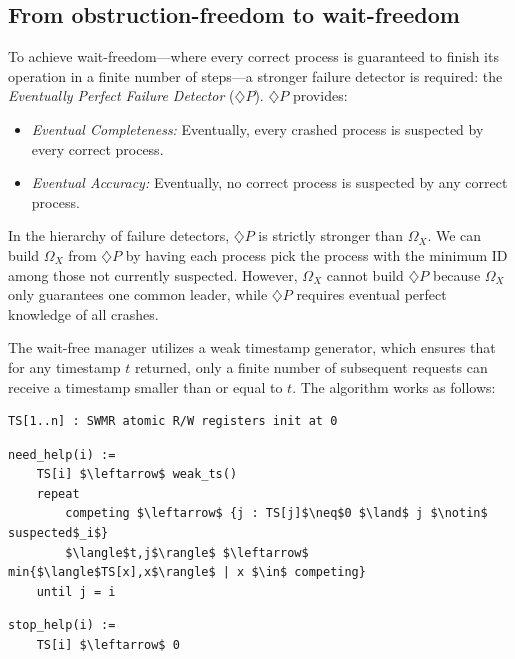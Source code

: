 \subsection{From obstruction-freedom to wait-freedom}
To achieve wait-freedom—where every correct process is guaranteed to finish its operation in a finite number of steps—a stronger failure detector is required: the \textit{Eventually Perfect Failure Detector} ($\diamondsuit P$). $\diamondsuit P$ provides:
\begin{itemize}
    \item \textit{Eventual Completeness:} Eventually, every crashed process is suspected by every correct process.
    \item \textit{Eventual Accuracy:} Eventually, no correct process is suspected by any correct process.

\end{itemize}

In the hierarchy of failure detectors, $\diamondsuit P$ is strictly stronger than $\Omega_X$. We can build $\Omega_X$ from $\diamondsuit P$ by having each process pick the process with the minimum ID among those not currently suspected. However, $\Omega_X$ cannot build $\diamondsuit P$ because $\Omega_X$ only guarantees one common leader, while $\diamondsuit P$ requires eventual perfect knowledge of all crashes.

The wait-free manager utilizes a weak timestamp generator, which ensures that for any timestamp $t$ returned, only a finite number of subsequent requests can receive a timestamp smaller than or equal to $t$. The algorithm works as follows:

\begin{minipage}{\textwidth}
\begin{lstlisting}[mathescape]
TS[1..n] : SWMR atomic R/W registers init at 0
\end{lstlisting}
\begin{lstlisting}[mathescape]
need_help(i) :=
    TS[i] $\leftarrow$ weak_ts()
    repeat
        competing $\leftarrow$ {j : TS[j]$\neq$0 $\land$ j $\notin$ suspected$_i$}
        $\langle$t,j$\rangle$ $\leftarrow$ min{$\langle$TS[x],x$\rangle$ | x $\in$ competing}
    until j = i
\end{lstlisting}
\begin{lstlisting}[mathescape]
stop_help(i) :=
    TS[i] $\leftarrow$ 0 
\end{lstlisting}
\end{minipage}

